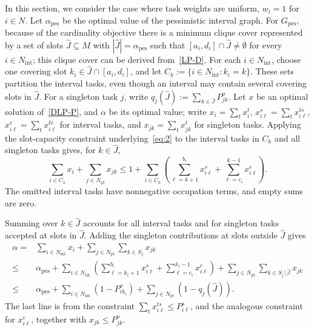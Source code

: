 \documentclass{article}
\DeclareMathOperator{\pes}{pes}
\begin{document}
In this section, we consider the case where task weights are uniform, $ w_i = 1 $ for $ i \in N$. 
%
Let $\alpha_{\pes}$ be the optimal value of the pessimistic interval graph.
{For $G_{\pes}$, because of the cardinality objective there is a minimum clique cover represented by a set of slots $\hat{J}\subseteq M$ with $|\hat{J}|=\alpha_{\pes}$ such that $[a_i,d_i]\cap \hat{J}\neq\emptyset$ for every $i\in N_{\mathrm{int}}$; this clique cover can be derived from~\eqref{LP-D}.}
{For each $i\in N_{\mathrm{int}}$, choose one covering slot $k_i\in \hat{J}\cap[a_i,d_i]$, and let $C_k:=\{i\in N_{\mathrm{int}}:k_i=k\}$. These sets partition the interval tasks, even though an interval may contain several covering slots in $\hat{J}$. For a singleton task $j$, write $q_j(\hat{J}):=\sum_{k\in \hat{J}}P_{jk}^o$.}
Let $x$ be an optimal solution of~\eqref{DLP-P}, and $\alpha$ be its optimal value;
{write $x_i=\sum_t x_i^t$, $x_{i\ell}^s=\sum_t x_{i\ell}^{ts}$, $x_{i\ell}^e=\sum_t x_{i\ell}^{te}$ for interval tasks, and $x_{jk}=\sum_t x_{jk}^t$ for singleton tasks. Applying the slot-capacity constraint underlying~\eqref{eq:2} to the interval tasks in $C_k$ and all singleton tasks gives, for $k\in \hat{J}$,
\[
\sum_{i\in C_k}x_i+\sum_{j\in N_{\mathrm{pt}}}x_{jk}
\leq1+\sum_{i\in C_k}\left(\sum_{\ell=k+1}^{b_i}x_{i\ell}^s+\sum_{\ell=c_i}^{k-1}x_{i\ell}^e\right).
\]
The omitted interval tasks have nonnegative occupation terms, and empty sums are zero.}

{Summing over $k\in \hat{J}$ accounts for all interval tasks and for singleton tasks accepted at slots in $\hat{J}$. Adding the singleton contributions at slots outside $\hat{J}$ gives}
{
\[\begin{aligned}
\alpha={}&\sum_{i\in N_{\mathrm{int}}}x_i+\sum_{j\in N_{\mathrm{pt}}}\sum_{k\in S_j}x_{jk}\\
\leq{}&\alpha_{\pes}+\sum_{i\in N_{\mathrm{int}}}\left(\sum_{\ell=k_i+1}^{b_i}x_{i\ell}^s+\sum_{\ell=c_i}^{k_i-1}x_{i\ell}^e\right)
 +\sum_{j\in N_{\mathrm{pt}}}\sum_{k\in S_j\setminus \hat{J}}x_{jk}\\
\leq{}&\alpha_{\pes}+\sum_{i\in N_{\mathrm{int}}}(1-P_{ik_i}^o)
 +\sum_{j\in N_{\mathrm{pt}}}(1-q_j(\hat{J})).
\end{aligned}\]}
The last line is from the constraint $\sum_t x_{i\ell}^{ts}\leq P_{i\ell}^s$, and the analogous constraint for $x_{i\ell}^e${, together with $x_{jk}\leq P_{jk}^o$}.
\end{document}
